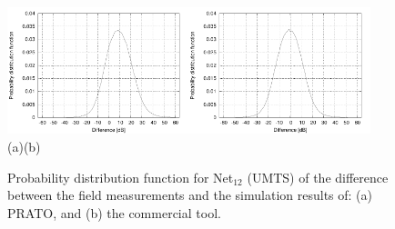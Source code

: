 \begin{figure}[h]
\centering

\includegraphics[width=0.47\textwidth]{08-real_network_planning/img/umts_prato_diff}\includegraphics[width=0.47\textwidth]{08-real_network_planning/img/umts_tcpu_diff}\\\hspace{0.4cm}(a)\hspace{6.7cm}(b)

\caption{Probability distribution function for Net$_{12}$ (UMTS) of the difference
between the field measurements and the simulation results of: (a)
PRATO, and (b) the commercial tool.\label{fig:08-Prediction_difference-UMTS}}
\end{figure}


